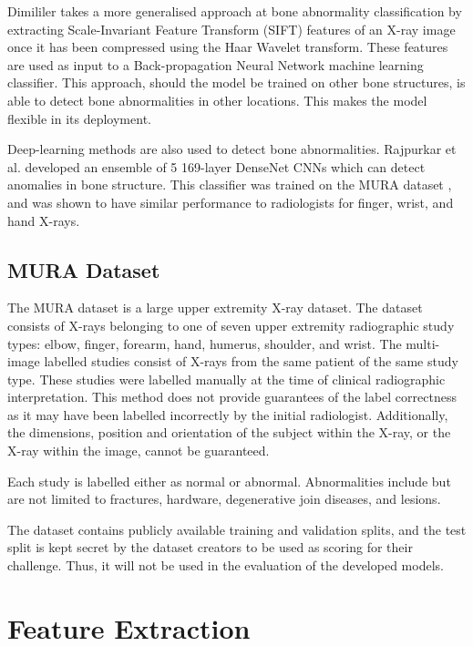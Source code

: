 \documentclass{IEEEtran}
\begin{document}
	Dimililer \cite{DIMILILER2017260} takes a more generalised approach at bone abnormality classification by extracting Scale-Invariant Feature Transform (SIFT) \cite{lowe2004distinctive} features of an X-ray image once it has been compressed using the Haar Wavelet transform. These features are used as input to a Back-propagation Neural Network machine learning classifier. This approach, should the model be trained on other bone structures, is able to detect bone abnormalities in other locations. This makes the model flexible in its deployment.
	
	Deep-learning methods are also used to detect bone abnormalities. Rajpurkar et al. \cite{rajpurkar2017mura} developed an ensemble of 5 169-layer DenseNet CNNs which can detect anomalies in bone structure. This classifier was trained on the MURA dataset \cite{rajpurkar2017mura}, and was shown to have similar performance to radiologists for finger, wrist, and hand X-rays.
	
	\subsection{MURA Dataset}
	
	The MURA dataset \cite{rajpurkar2017mura} is a large upper extremity X-ray dataset. The dataset consists of X-rays belonging to one of seven upper extremity radiographic study types: elbow, finger, forearm, hand, humerus, shoulder, and wrist. The multi-image labelled studies consist of X-rays from the same patient of the same study type. These studies were labelled manually at the time of clinical radiographic interpretation. This method does not provide guarantees of the label correctness as it may have been labelled incorrectly by the initial radiologist. Additionally, the dimensions, position and orientation of the subject within the X-ray, or the X-ray within the image, cannot be guaranteed. 
	
	Each study is labelled either as normal or abnormal. Abnormalities include but are not limited to fractures, hardware, degenerative join diseases, and lesions. 
	
	The dataset contains publicly available training and validation splits, and the test split is kept secret by the dataset creators to be used as scoring for their challenge. Thus, it will not be used in the evaluation of the developed models.
	
	\section{Feature Extraction} \label{sec:features}
	
\end{document}

